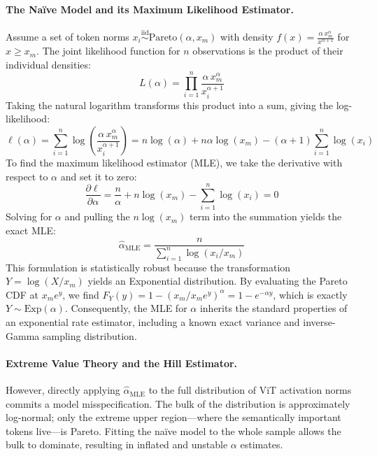 \documentclass[12pt]{article}
\begin{document}
\paragraph{The Naïve Model and its Maximum Likelihood Estimator.}
Assume a set of token norms $x_i \overset{\text{iid}}{\sim} \text{Pareto}(\alpha, x_m)$ with density $f(x) = \frac{\alpha\, x_m^\alpha}{x^{\alpha+1}}$ for $x \ge x_m$. The joint likelihood function for $n$ observations is the product of their individual densities:
%
\begin{equation}
    L(\alpha) = \prod_{i=1}^n \frac{\alpha\, x_m^\alpha}{x_i^{\alpha+1}}
\end{equation}
%
Taking the natural logarithm transforms this product into a sum, giving the log-likelihood:
%
\begin{equation}
    \ell(\alpha) = \sum_{i=1}^n \log \left( \frac{\alpha\, x_m^\alpha}{x_i^{\alpha+1}} \right) = n\log(\alpha) + n\alpha\log(x_m) - (\alpha + 1)\sum_{i=1}^n \log(x_i)
\end{equation}
%
To find the maximum likelihood estimator (MLE), we take the derivative with respect to $\alpha$ and set it to zero:
%
\begin{equation}
    \frac{\partial \ell}{\partial \alpha} = \frac{n}{\alpha} + n\log(x_m) - \sum_{i=1}^n \log(x_i) = 0
\end{equation}
%
Solving for $\alpha$ and pulling the $n\log(x_m)$ term into the summation yields the exact MLE:
%
\begin{equation}
    \hat{\alpha}_{\text{MLE}} = \frac{n}{\sum_{i=1}^n \log(x_i / x_m)}
\end{equation}
%
This formulation is statistically robust because the transformation $Y = \log(X/x_m)$ yields an Exponential distribution. By evaluating the Pareto CDF at $x_m e^y$, we find $F_Y(y) = 1 - (x_m / x_m e^y)^\alpha = 1 - e^{-\alpha y}$, which is exactly $Y \sim \text{Exp}(\alpha)$. Consequently, the MLE for $\alpha$ inherits the standard properties of an exponential rate estimator, including a known exact variance and inverse-Gamma sampling distribution.

\paragraph{Extreme Value Theory and the Hill Estimator.}
However, directly applying $\hat{\alpha}_{\text{MLE}}$ to the full distribution of ViT activation norms commits a model misspecification. The bulk of the distribution is approximately log-normal; only the extreme upper region—where the semantically important tokens live—is Pareto. Fitting the naïve model to the whole sample allows the bulk to dominate, resulting in inflated and unstable $\alpha$ estimates.
\end{document}

